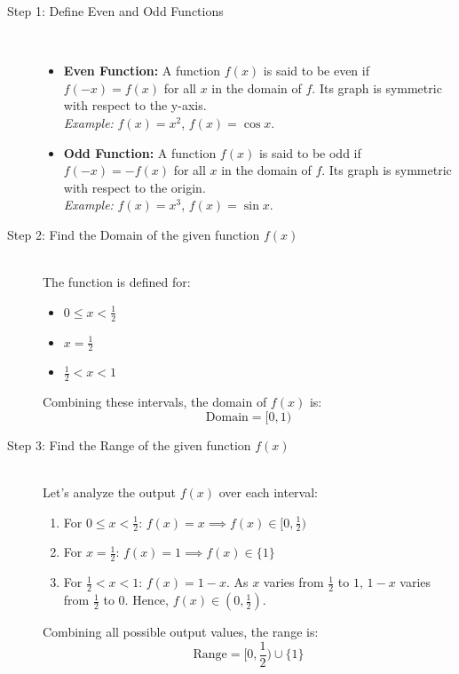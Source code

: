 \documentclass[11pt, a4paper]{article}
\begin{document}
\begin{description}
    \item[Step 1: Define Even and Odd Functions] \ 
    \begin{itemize}
        \item \textbf{Even Function:} A function $f(x)$ is said to be even if $f(-x) = f(x)$ for all $x$ in the domain of $f$. Its graph is symmetric with respect to the y-axis. \\
        \textit{Example:} $f(x) = x^2$, $f(x) = \cos x$.
        \item \textbf{Odd Function:} A function $f(x)$ is said to be odd if $f(-x) = -f(x)$ for all $x$ in the domain of $f$. Its graph is symmetric with respect to the origin. \\
        \textit{Example:} $f(x) = x^3$, $f(x) = \sin x$.
    \end{itemize}

    \item[Step 2: Find the Domain of the given function $f(x)$] \ \\
    The function is defined for:
    \begin{itemize}
        \item $0 \le x < \frac{1}{2}$
        \item $x = \frac{1}{2}$
        \item $\frac{1}{2} < x < 1$
    \end{itemize}
    Combining these intervals, the domain of $f(x)$ is:
    \[ \text{Domain} = [0, 1) \]

    \item[Step 3: Find the Range of the given function $f(x)$] \ \\
    Let's analyze the output $f(x)$ over each interval:
    \begin{enumerate}
        \item For $0 \le x < \frac{1}{2}$: $f(x) = x \implies f(x) \in [0, \frac{1}{2})$
        \item For $x = \frac{1}{2}$: $f(x) = 1 \implies f(x) \in \{1\}$
        \item For $\frac{1}{2} < x < 1$: $f(x) = 1 - x$. As $x$ varies from $\frac{1}{2}$ to $1$, $1-x$ varies from $\frac{1}{2}$ to $0$. Hence, $f(x) \in (0, \frac{1}{2})$.
    \end{enumerate}
    Combining all possible output values, the range is:
    \[ \text{Range} = [0, \frac{1}{2}) \cup \{1\} \]


\end{description}
\end{document}
